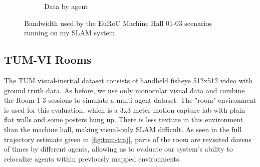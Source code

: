 \begin{figure}[h]
\begin{subfigure}[b]{0.45\linewidth}
        \caption{Data by agent}
    \end{subfigure}%

    \caption{Bandwidth used by the EuRoC Machine Hall 01-03 scenarios running on my SLAM system.}
    \label{fig:euroc-mh-01-02-bandwith}
\end{figure}

\subsection{TUM-VI Rooms}
\label{sec:tum-rooms}
The TUM visual-inertial dataset \autocite{8593419} consists of handheld fisheye 512x512 video with ground truth data. As before, we use only monocular visual data and combine the Room 1-3 sessions to simulate a multi-agent dataset. The "room" environment is used for this evaluation, which is a 3x3 meter motion capture lab with plain flat walls and some posters hung up. There is less texture in this environment than the machine hall, making visual-only SLAM difficult. As seen in the full trajectory estimate given in \autoref{fig:tum-traj}, parts of the room are revisited dozens of times by different agents, allowing us to evaluate our system's ability to relocalize agents within previously mapped environments.

